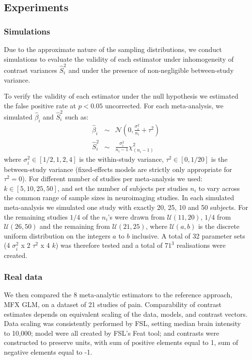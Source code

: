 \documentclass{llncs}
\newcommand{\effectvector}{\hat\beta}
\newcommand{\effect}[1][i]{\effectvector_{#1}}
\newcommand{\vareffect}[1][i]{\hat S^2_{#1}}
\newcommand{\nStudies}{k}
\newcommand{\varBetween}{\tau^2}
\newcommand{\sampleSize}[1][i]{n_{#1}}
\newcommand{\varWithin}[1][i]{\sigma^2_{#1}}
\begin{document}
\subsection{Experiments}

\subsubsection{Simulations}
Due to the approximate nature of the sampling distributions, we conduct simulations to evaluate the validity of each estimator under inhomogeneity of contrast variances $\vareffect$ and under the presence of non-negligible between-study variance.


To verify the validity of each estimator under the null hypothesis we estimated the false positive rate at $p<0.05$ uncorrected. For each meta-analysis, we simulated $\effect$ and $\vareffect$ such as:
\begin{eqnarray}
	\effect &\sim& \mathcal{N}(0, \frac{\varWithin}{\sampleSize}+\varBetween) \\
	\vareffect &\sim& \frac{\varWithin}{\sampleSize-1} \chi^2_{(\sampleSize-1)}%
\end{eqnarray}
where $\varWithin \in [1/2, 1, 2, 4]$ is the within-study variance, $\varBetween \in [0, 1/20]$ is the between-study variance (fixed-effects models are strictly only appropriate for $\varBetween=0$). For different number of studies per meta-analysis we used: $\nStudies \in [5, 10, 25, 50]$, and set the number of subjects per studies $\sampleSize$ to vary across the common range of sample sizes in neuroimaging studies. In each simulated meta-analysis we simulated one study with exactly 20, 25, 10 and 50 subjects. For the remaining studies $1/4$ of the $\sampleSize$'s were drawn from $\mathcal{U}(11,20)$, $1/4$ from $\mathcal{U}(26,50)$ and the remaining from $\mathcal{U}(21,25)$, where $\mathcal{U}(a,b)$ is the discrete uniform distribution on the integers $a$ to $b$ inclusive. A total of 32 parameter sets (4 $\varWithin$ x 2 $\varBetween$ x 4 $\nStudies$) was therefore tested and a total of $71^3$ realisations were created.


\subsubsection{Real data}
We then compared the 8 meta-analytic estimators to the reference approach, MFX GLM, on a dataset of 21 studies of pain. 
Comparability of contrast estimates depends on equivalent scaling of the data, models, and contrast vectors. Data scaling was consistently performed by FSL, setting median brain intensity to 10,000; model were all created by FSL's Feat tool; and contrasts were constructed to preserve units, with sum of positive elements equal to 1, sum of negative elements equal to -1. 
\end{document}
